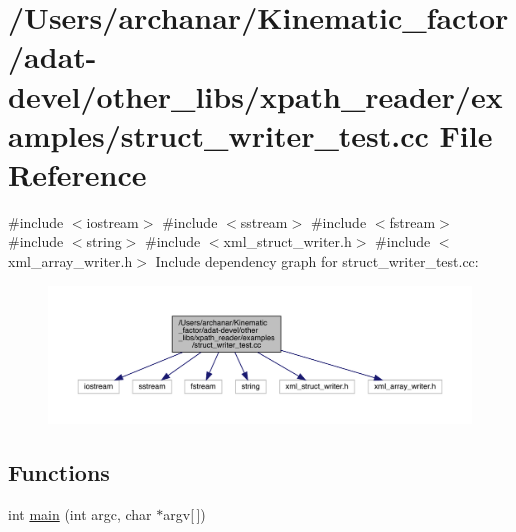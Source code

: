 \hypertarget{adat-devel_2other__libs_2xpath__reader_2examples_2struct__writer__test_8cc}{}\section{/\+Users/archanar/\+Kinematic\+\_\+factor/adat-\/devel/other\+\_\+libs/xpath\+\_\+reader/examples/struct\+\_\+writer\+\_\+test.cc File Reference}
\label{adat-devel_2other__libs_2xpath__reader_2examples_2struct__writer__test_8cc}
{\ttfamily \#include $<$iostream$>$}\newline
{\ttfamily \#include $<$sstream$>$}\newline
{\ttfamily \#include $<$fstream$>$}\newline
{\ttfamily \#include $<$string$>$}\newline
{\ttfamily \#include $<$xml\+\_\+struct\+\_\+writer.\+h$>$}\newline
{\ttfamily \#include $<$xml\+\_\+array\+\_\+writer.\+h$>$}\newline
Include dependency graph for struct\+\_\+writer\+\_\+test.\+cc\+:
\nopagebreak
\begin{figure}[H]
\begin{center}
\leavevmode
\includegraphics[width=350pt]{d7/d38/adat-devel_2other__libs_2xpath__reader_2examples_2struct__writer__test_8cc__incl}
\end{center}
\end{figure}
\subsection*{Functions}
\begin{DoxyCompactItemize}
\item 
int \mbox{\hyperlink{adat-devel_2other__libs_2xpath__reader_2examples_2struct__writer__test_8cc_a0ddf1224851353fc92bfbff6f499fa97}{main}} (int argc, char $\ast$argv\mbox{[}$\,$\mbox{]})
\end{DoxyCompactItemize}


